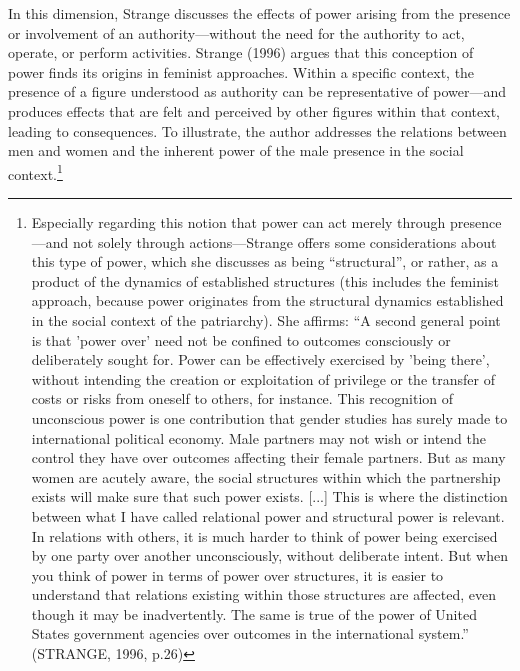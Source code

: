 In this dimension, Strange discusses the effects of power arising from the presence or involvement of an authority—without the need for the authority to act, operate, or perform activities. Strange (1996) argues that this conception of power finds its origins in feminist approaches. Within a specific context, the presence of a figure understood as authority can be representative of power—and produces effects that are felt and perceived by other figures within that context, leading to consequences. 
To illustrate, the author addresses the relations between men and women and the inherent power of the male presence in the social context.\footnote{Especially regarding this notion that power can act merely through presence—and not solely through actions—Strange offers some considerations about this type of power, which she discusses as being “structural”, or rather, as a product of the dynamics of established structures (this includes the feminist approach, because power originates from the structural dynamics established in the social context of the patriarchy). She affirms: “A second general point is that 'power over' need not be confined to outcomes consciously or deliberately sought for. Power can be effectively exercised by 'being there', without intending the creation or exploitation of privilege or the transfer of costs or risks from oneself to others, for instance. This recognition of unconscious power is one contribution that gender studies has surely made to international political economy. Male partners may not wish or intend the control they have over outcomes affecting their female partners. But as many women are acutely aware, the social structures within which the partnership exists will make sure that such power exists. [...] This is where the distinction between what I have called relational power and structural power is relevant. In relations with others, it is much harder to think of power being exercised by one party over another unconsciously, without deliberate intent. But when you think of power in terms of power over structures, it is easier to understand that relations existing within those structures are affected, even though it may be inadvertently. The same is true of the power of United States government agencies over outcomes in the international system.” (STRANGE, 1996, p.26)} 
